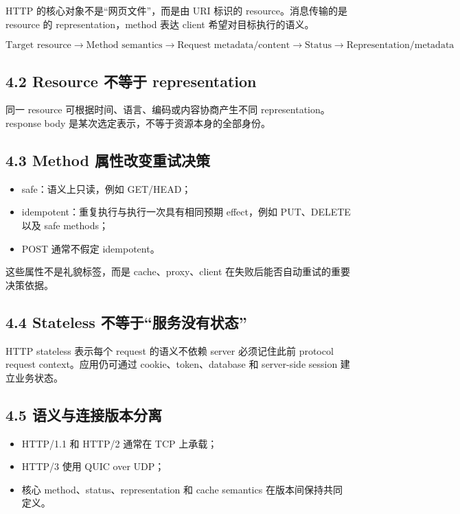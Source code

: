 \documentclass[UTF8,fontset=none,11pt,a4paper]{ctexart}
\providecommand{\tightlist}{\setlength{\itemsep}{0pt}\setlength{\parskip}{0pt}}
\begin{document}
HTTP 的核心对象不是``网页文件''，而是由 URI 标识的
resource。消息传输的是 resource 的 representation，method 表达 client
希望对目标执行的语义。

\[
\boxed{
\text{Target resource}
\to \text{Method semantics}
\to \text{Request metadata/content}
\to \text{Status}
\to \text{Representation/metadata}
}
\]

\subsection{4.2 Resource 不等于
representation}\label{41-resource-ux4e0dux7b49ux4e8e-representation}

同一 resource 可根据时间、语言、编码或内容协商产生不同
representation。response body 是某次选定表示，不等于资源本身的全部身份。

\subsection{4.3 Method
属性改变重试决策}\label{42-method-ux5c5eux6027ux6539ux53d8ux91cdux8bd5ux51b3ux7b56}

\begin{itemize}
\tightlist
\item
  safe：语义上只读，例如 GET/HEAD；
\item
  idempotent：重复执行与执行一次具有相同预期 effect，例如 PUT、DELETE
  以及 safe methods；
\item
  POST 通常不假定 idempotent。
\end{itemize}

这些属性不是礼貌标签，而是 cache、proxy、client
在失败后能否自动重试的重要决策依据。

\subsection{4.4 Stateless
不等于``服务没有状态''}\label{43-stateless-ux4e0dux7b49ux4e8eux670dux52a1ux6ca1ux6709ux72b6ux6001}

HTTP stateless 表示每个 request 的语义不依赖 server 必须记住此前
protocol request context。应用仍可通过 cookie、token、database 和
server-side session 建立业务状态。

\subsection{4.5
语义与连接版本分离}\label{44-ux8bedux4e49ux4e0eux8fdeux63a5ux7248ux672cux5206ux79bb}

\begin{itemize}
\tightlist
\item
  HTTP/1.1 和 HTTP/2 通常在 TCP 上承载；
\item
  HTTP/3 使用 QUIC over UDP；
\item
  核心 method、status、representation 和 cache semantics
  在版本间保持共同定义。
\end{itemize}
\end{document}
